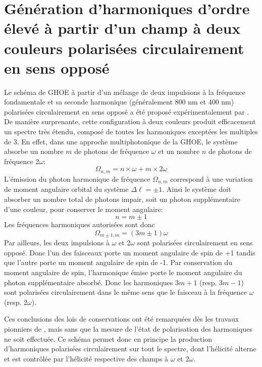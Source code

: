 \section[GHOE à partir d'un champ à deux couleurs polarisées circulairement en sens opposé]{Génération d'harmoniques d'ordre élevé à partir d'un champ à deux couleurs polarisées circulairement en sens opposé}
\label{sec:Intro2couleurs}
Le schéma de GHOE à partir d'un mélange de deux impulsions à la fréquence fondamentale et sa seconde harmonique (généralement 800 nm et 400 nm) polarisées circulairement en sens opposé a été proposé expérimentalement par . De manière surprenante, cette configuration à deux couleurs produit efficacement un spectre très étendu, composé de toutes les harmoniques exceptées les multiples de 3. En effet, dans une approche multiphotonique de la GHOE, le système absorbe un nombre $m$ de photons de fréquence $\omega$ et un nombre $n$ de photons de fréquence 2$\omega$: 
\begin{equation}
\Omega_{n,m} = n \times \omega + m \times 2 \omega
\end{equation}
L'émission du photon harmonique de fréquence $\Omega_{n,m}$ correspond à une variation de moment angulaire orbital du système $\Delta \ell = \pm 1$. Ainsi le système doit absorber un nombre total de photons impair, soit un photon supplémentaire d'une couleur, pour conserver le moment angulaire:
\begin{equation}
n = m \pm 1
\end{equation}
Les fréquences harmoniques autorisées sont donc
\begin{equation}
\Omega_{m \pm 1,m} = (3m \pm 1) \omega
\end{equation}
Par ailleurs, les deux impulsions à $\omega$ et 2$\omega$ sont polarisées circulairement en sens opposé. Donc l'un des faisceaux porte un moment angulaire de spin de +1 tandis que l'autre porte un moment angulaire de spin de -1. Par conservation du moment angulaire de spin, l'harmonique émise porte le moment angulaire du photon supplémentaire absorbé. Donc les harmoniques $3m+1$ (resp. $3m-1$) sont polarisées circulairement dans le même sens que le faisceau à la fréquence $\omega$ (resp. 2$\omega$).

Ces conclusions des lois de conservations ont été remarquées dès les travaux pionniers de , mais sans que la mesure de l'état de polarisation des harmoniques ne soit effectuée. Ce schéma permet donc en principe la production d'harmoniques polarisées circulairement sur tout le spectre, dont l'hélicité alterne et est contrôlée par l'hélicité respective des champs à $\omega$ et 2$\omega$.

